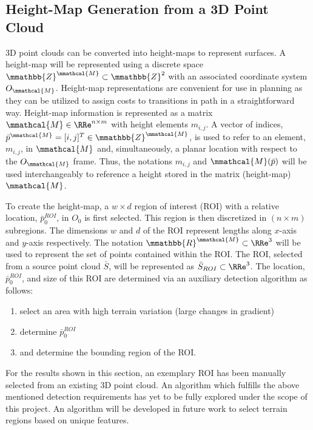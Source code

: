 		\subsection{Height-Map Generation from a 3D Point Cloud}
			
			3D point clouds can be converted into height-maps to represent surfaces. A height-map will be represented using a discrete space $\mmathbb{Z}^{\mmathcal{M}}\subset\mmathbb{Z}^{2}$ with an associated coordinate system $O_{\mmathcal{M}}$. Height-map representations are convenient for use in planning as they can be utilized to assign costs to transitions in path in a straightforward way. Height-map information is represented as a matrix $\mmathcal{M}\in\RRe^{n\times m}$ with height elements $m_{i,j}$. A vector of indices, $\bar{p}^{\mmathcal{M}} = [i,j]^{T}\in\mmathbb{Z}^{\mmathcal{M}}$, is used to refer to an element, $m_{i,j}$, in $\mmathcal{M}$ and, simultaneously, a planar location with respect to the $O_{\mmathcal{M}}$ frame. Thus, the notations $m_{i,j}$ and $\mmathcal{M}(\bar{p})$ will be used interchangeably to reference a height stored in the matrix (height-map) $\mmathcal{M}$.

			To create the height-map, a $w\times d$ region of interest (ROI) with a relative location, $\bar{p}_{0}^{ROI}$, in $O_{0}$ is first selected. This region is then discretized in $(n\times m)$ subregions. The dimensions $w$ and $d$ of the ROI represent lengths along $x$-axis and $y$-axis respectively. The notation $\mmathbb{R}^{\mmathcal{M}}\subset \RRe^{3}$ will be used to represent the set of points contained within the ROI.  The ROI, selected from a source point cloud $\bar{S}$, will be represented as $\bar{S}_{ROI}\subset\RRe^{3}$. The location, $\bar{p}_{0}^{ROI}$, and size of this ROI are determined via an auxiliary detection algorithm as follows:
			\begin{enumerate}
				\item select an area with high terrain variation (large changes in gradient)
				\item determine $\bar{p}_{0}^{ROI}$
				\item and determine the bounding region of the ROI.
			\end{enumerate}%
			For the results shown in this section, an exemplary ROI has been manually selected from an existing 3D point cloud. An algorithm which fulfills the above mentioned detection requirements has yet to be fully explored under the scope of this project.
			An algorithm will be developed in future work to select terrain regions based on unique features. %

